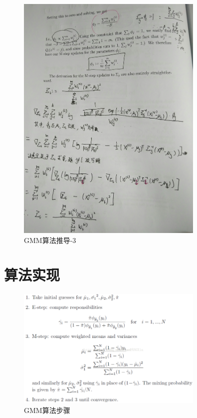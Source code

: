 \documentclass{ctexart}
\begin{document}
\begin{figure}[H]
\begin{center}
\includegraphics[width=0.8\textwidth]{fig/gmm3.jpg}  
\caption{GMM算法推导-3}
\end{center}
\end{figure}


\section{算法实现}
\begin{figure}[H]
\begin{center}
\includegraphics[width=0.8\textwidth]{fig/steps.png}  
\caption{GMM算法步骤}
\end{center}
\end{figure}
\end{document}
